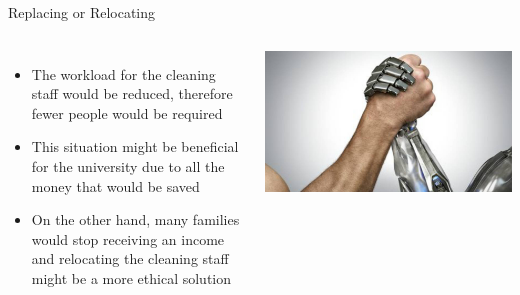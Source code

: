 \documentclass[18pt]{beamer}
\begin{document}
    \begin{frame}{Replacing or Relocating}
        \begin{columns}
            \begin{itemize}
                \item The workload for the cleaning staff would be reduced, therefore fewer people would be required \pause
                \item This situation might be beneficial for the university due to all the money that would be saved \pause
                \item On the other hand, many families would stop receiving an income  and relocating the cleaning staff might be a more ethical solution
            \end{itemize}
            \includegraphics[width=0.99\columnwidth]{humanvsrobot}
        \end{columns}
    \end{frame}
\end{document}
